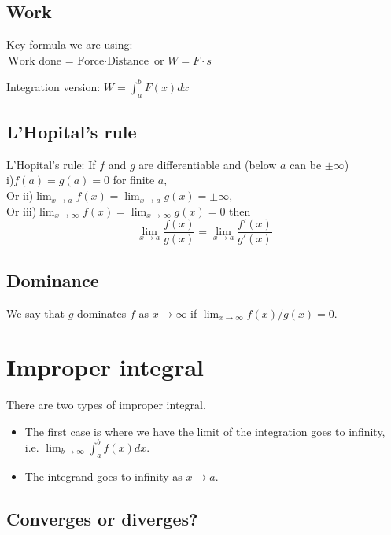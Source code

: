 \documentclass[12pt]{article}
\theoremstyle{definition}
\theoremstyle{definition}
\theoremstyle{remark}
\theoremstyle{definition}
\theoremstyle{definition}
\theoremstyle{definition}
\begin{document}
\subsection{Work}

Key formula we are using:\\
$\text{Work done = Force} \cdot \text{Distance}$ or 
$W=F\cdot s$

Integration version:
$W = \int^b_a F(x) dx$


\subsection{L'Hopital's rule}

L’Hopital’s rule: If $f$ and $g$ are differentiable and (below $a$ can be $\pm \infty$)\\
i)$f(a) = g(a) = 0$ for finite $a$, \\
Or ii)$\lim_{x\to a} f(x)=\lim_{x\to a} g(x)= \pm \infty$,\\ 
Or iii)$\lim_{x\to \infty} f(x)= \lim_{x\to \infty} g(x) = 0$
then 
\[\lim_{x\to a}\frac{f(x)}{g(x)} = \lim_{x\to a} \frac{f'(x)}{g'(x)} \]

\subsection{Dominance}
We say that $g$ dominates $f$ as $x \to \infty$ if $\lim_{x\to \infty}f(x)/g(x) = 0$. 

\section{Improper integral}
There are two types of improper integral.

\begin{itemize}
	\item The first case is where we have the limit of the integration goes to infinity, i.e. $\lim_{b \to \infty} \int^b_a f(x) dx$.
	\item The integrand goes to infinity as $x \to a$.
\end{itemize}

\subsection{Converges or diverges?}
\end{document}
